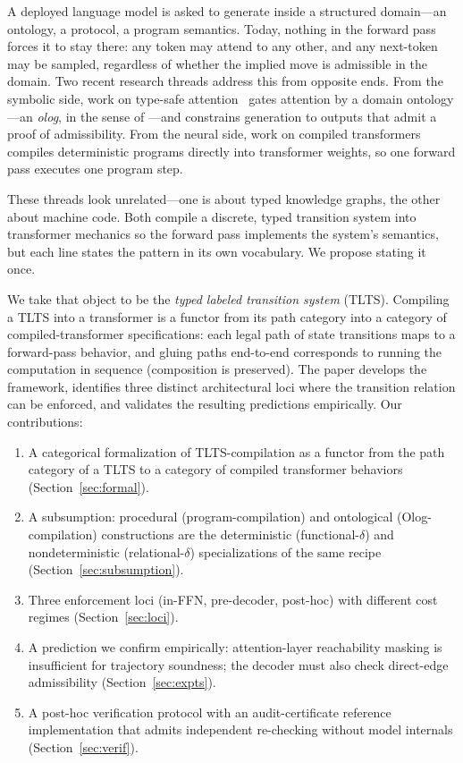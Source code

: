 \documentclass[preprint]{nesy2026}
\begin{document}
A deployed language model is asked to generate inside a structured
domain---an ontology, a protocol, a program semantics. Today, nothing
in the forward pass forces it to stay there: any token may attend to
any other, and any next-token may be sampled, regardless of whether
the implied move is admissible in the domain. Two recent research
threads address this from opposite ends. From the symbolic side,
work on type-safe attention~\citep{constrained_decoding} gates
attention by a domain ontology---an \emph{olog}, in the sense of
\citet{spivakkent2012ologs}---and constrains generation to outputs
that admit a proof of admissibility. From the neural side, work on compiled
transformers \citep{lindner2023tracr,perez2021turing} compiles
deterministic programs directly into transformer weights, so one
forward pass executes one program step.

These threads look unrelated---one is about typed knowledge graphs,
the other about machine code. Both compile a discrete, typed
transition system into transformer mechanics so the forward pass
implements the system's semantics, but each line states the pattern
in its own vocabulary. We propose stating it once.

We take that object to be the \emph{typed labeled transition
system} (TLTS). Compiling a TLTS into a transformer is a functor
from its path category into a category of compiled-transformer
specifications: each legal path of state transitions maps to a
forward-pass behavior, and gluing paths end-to-end corresponds to
running the computation in sequence (composition is preserved). The
paper develops the framework, identifies three
distinct architectural loci where the transition relation can be
enforced, and validates the resulting predictions empirically. Our
contributions:

\begin{enumerate}
\item A categorical formalization of TLTS-compilation as a functor
  from the path category of a TLTS to a category of compiled
  transformer behaviors (Section~\ref{sec:formal}).
\item A subsumption: procedural (program-compilation) and
  ontological (Olog-compilation) constructions are the deterministic
  (functional-$\delta$) and nondeterministic (relational-$\delta$)
  specializations of the same recipe (Section~\ref{sec:subsumption}).
\item Three enforcement loci (in-FFN, pre-decoder, post-hoc) with
  different cost regimes (Section~\ref{sec:loci}).
\item A prediction we confirm empirically: attention-layer
  reachability masking is insufficient for trajectory soundness; the
  decoder must also check direct-edge admissibility
  (Section~\ref{sec:expts}).
\item A post-hoc verification protocol with an audit-certificate
  reference implementation that admits independent re-checking
  without model internals (Section~\ref{sec:verif}).
\end{enumerate}
\end{document}
